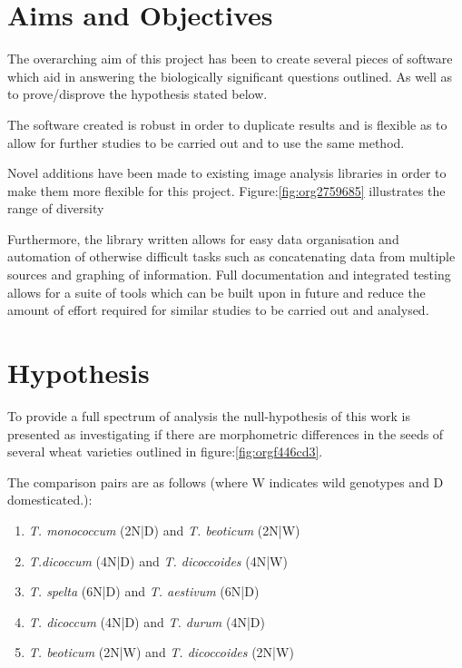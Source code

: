 \documentclass[11pt]{report}
\begin{document}
\section{Aims and Objectives}
\label{sec:org9bcf424}

The overarching aim of this project has been to create several pieces of software which aid in answering the biologically significant questions outlined. As well as to prove/disprove the hypothesis stated below.

The software created is robust in order to duplicate results and is flexible as to allow for further studies to be carried out and to use the same method.

Novel additions have been made to existing image analysis libraries in order to make them more flexible for this project. Figure:\ref{fig:org2759685} illustrates the range of diversity

Furthermore, the library written allows for easy data organisation and automation of otherwise difficult tasks such as concatenating data from multiple sources and graphing of information. Full documentation and integrated testing allows for a suite of tools which can be built upon in future and reduce the amount of effort required for similar studies to be carried out and analysed.

\section{Hypothesis}
\label{sec:org9ef64ad}
To provide a full spectrum of analysis the null-hypothesis of this work is presented as investigating if there are morphometric differences in the seeds of several wheat varieties outlined in figure:\ref{fig:orgf446cd3}.

The comparison pairs are as follows (where W indicates wild genotypes and D domesticated.):

\begin{enumerate}
\item \emph{T. monococcum} (2N|D) and \emph{T. beoticum} (2N|W)
\item \emph{T.dicoccum} (4N|D) and \emph{T. dicoccoides} (4N|W)
\item \emph{T. spelta} (6N|D) and \emph{T. aestivum} (6N|D)
\item \emph{T. dicoccum} (4N|D) and \emph{T. durum} (4N|D)
\item \emph{T. beoticum} (2N|W) and \emph{T. dicoccoides} (2N|W)
\end{enumerate}
\end{document}
